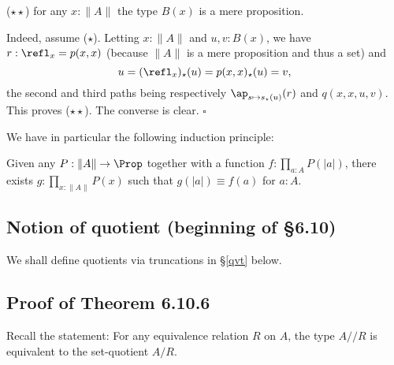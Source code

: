 \documentclass[12pt]{article}
\begin{document}
\nn($\star\star$) for any $x:\lVert A\rVert$ the type $B(x)$ is a mere proposition.

Indeed, assume ($\star$). Letting $x:\lVert A\rVert$ and $u,v:B(x)$, we have $r:\refl_x=p(x,x)$ (because $\lVert A\rVert$ is a mere proposition and thus a set) and 
$$
u=(\refl_x)_\star(u)=p(x,x)_\star(u)=v,
$$ 
the second and third paths being respectively $\ap_{s\mapsto s_\star(u)}(r)$ and $q(x,x,u,v)$. This proves ($\star\star$). The converse is clear. $\square$

We have in particular the following induction principle:

Given any $P:\lVert A\rVert\to\Prop$ together with a function $f:\prod_{a:A}P(\lvert a\rvert)$, there exists $g:\prod_{x:\lVert A\rVert}P(x)$ such that $g(\lvert a\rvert)\equiv f(a)$ for $a:A$.


\subsection{Notion of quotient (beginning of \S6.10)}\label{610}

We shall define quotients via truncations in \S\ref{qvt} below.

\begin{comment}

To spell out the induction principle for the quotient $A/R$, let $\alpha(a,b):q(a)=q(b)$ be the path given from $q(a)$ to $q(b)$ whenever $R(a,b)$. 

Given $P:A/R\to\Set$ together with $f:\prod_{a:A}P(q(a))$ and 
$$
\beta(a,b):f(a)=^P_{\alpha(a,b)}f(b)
$$ 
for all $a,b$ such that $R(a,b)$, we have a $g:\prod_{x:A/R}P(x)$ such that $g(q(a))\equiv f(a)$ for all $a:A$, and $\apd_g(\alpha(a,b))=\beta(a,b)$ for all $a,b$ such that $R(a,b)$.

It is easy to see that if our type family $P:A/R\to\Set$ is such that $P(q(b))$ is a mere proposition whenever $R(a,b)$, and if we are just given an $f:\prod_{a:A}P(q(a))$, then we get a $g:\prod_{x:A/R}P(x)$ such that $g(q(a))\eq f(a)$ for all $a:A$.

\end{comment}


\subsection{Proof of Theorem 6.10.6}

Recall the statement: For any equivalence relation $R$ on $A$, the type $A/\!\!/R$ is equivalent to the set-quotient $A/R$.
\end{document}
